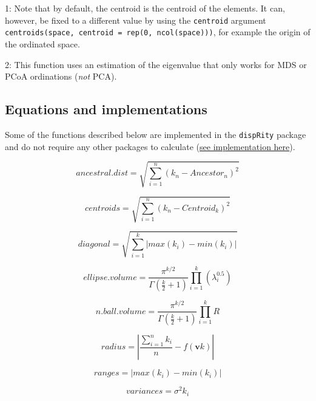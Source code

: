 \documentclass[]{book}
\theoremstyle{definition}
\theoremstyle{definition}
\theoremstyle{definition}
\theoremstyle{remark}
\begin{document}
1: Note that by default, the centroid is the centroid of the elements.
It can, however, be fixed to a different value by using the
\texttt{centroid} argument
\texttt{centroids(space,\ centroid\ =\ rep(0,\ ncol(space)))}, for
example the origin of the ordinated space.

2: This function uses an estimation of the eigenvalue that only works
for MDS or PCoA ordinations (\emph{not} PCA).

\subsection{Equations and
implementations}\label{equations-and-implementations}

Some of the functions described below are implemented in the
\texttt{dispRity} package and do not require any other packages to
calculate
(\href{https://github.com/TGuillerme/dispRity/blob/master/R/dispRity.metric.R}{see
implementation here}).

\begin{equation}
    ancestral.dist = \sqrt{\sum_{i=1}^{n}{({k}_{n}-Ancestor_{n})^2}}
\end{equation}

\begin{equation}
    centroids = \sqrt{\sum_{i=1}^{n}{({k}_{n}-Centroid_{k})^2}}
\end{equation}

\begin{equation}
    diagonal = \sqrt{\sum_{i=1}^{k}|max(k_i) - min(k_i)|}
\end{equation}

\begin{equation}
    ellipse.volume = \frac{\pi^{k/2}}{\Gamma(\frac{k}{2}+1)}\displaystyle\prod_{i=1}^{k} (\lambda_{i}^{0.5})
\end{equation}

\begin{equation}
    n.ball.volume = \frac{\pi^{k/2}}{\Gamma(\frac{k}{2}+1)}\displaystyle\prod_{i=1}^{k} R
\end{equation}

\begin{equation}
    radius = |\frac{\sum_{i=1}^{n}k_i}{n} - f(\mathbf{v}k)|
\end{equation}

\begin{equation}
    ranges = |max(k_i) - min(k_i)|
\end{equation}

\begin{equation}
    variances = \sigma^{2}{k_i}
\end{equation}
\end{document}

